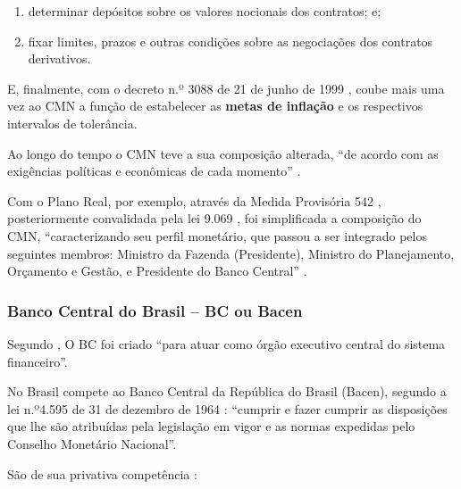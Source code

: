 \documentclass[
	10pt,				%
	openright,			%
	twoside,			%
	a5paper,			%
	english,			%
	french,				%
	spanish,			%
	brazil				%
	]{abntex2}
\begin{document}
\begin{enumerate}
\def\labelenumi{\alph{enumi})}
\tightlist
\item
  determinar depósitos sobre os valores nocionais dos contratos; e;
\item
  fixar limites, prazos e outras condições sobre as negociações dos
  contratos derivativos.
\end{enumerate}

E, finalmente, com o decreto n.º 3088 de 21 de junho de 1999
\cite{brasil1999}, coube mais uma vez ao CMN a função de estabelecer as
\textbf{metas de inflação} e os respectivos intervalos de tolerância.

Ao longo do tempo o CMN teve a sua composição alterada, ``de acordo com
as exigências políticas e econômicas de cada momento''
\cite[p.~19]{fortuna2015}.

Com o Plano Real, por exemplo, através da Medida Provisória 542
\cite{brasil1994}, posteriormente convalidada pela lei 9.069
\cite{brasil1995}, foi simplificada a composição do CMN,
``caracterizando seu perfil monetário, que passou a ser integrado pelos
seguintes membros: Ministro da Fazenda (Presidente), Ministro do
Planejamento, Orçamento e Gestão, e Presidente do Banco Central''
\cite[p.~19]{fortuna2015}.

\subsubsection{Banco Central do Brasil -- BC ou
Bacen}\label{banco-central-do-brasil-bc-ou-bacen}

Segundo , O BC foi criado ``para atuar
como órgão executivo central do sistema financeiro''.

No Brasil compete ao Banco Central da República do Brasil (Bacen),
segundo a lei n.º4.595 de 31 de dezembro de 1964 \cite{brasil1964c}:
``cumprir e fazer cumprir as disposições que lhe são atribuídas pela
legislação em vigor e as normas expedidas pelo Conselho Monetário
Nacional''.

São de sua privativa competência \cite[p.21]{fortuna2015}:
\end{document}

